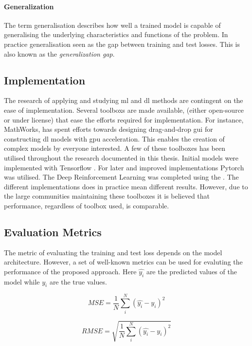 \paragraph{Generalization}
The term generalisation describes how well a trained model is capable of generalising the underlying characteristics and functions of the problem. In practice generalisation seen as the gap between training and test losses. This is also known as the \emph{generalization gap}. 

\subsection{Implementation}
The research of applying and studying \gls{ml} and \gls{dl} methods are contingent on the ease of implementation. Several toolboxs are made available, (either open-source or under license) that ease the efforts required for implementation. For instance, MathWorks, has spent efforts towards designing drag-and-drop \gls{gui} for constructing \gls{dl} models with \gls{gpu} acceleration. This enables the creation of complex models by everyone interested. A few of these toolboxes has been utilised throughout the research documented in this thesis. Initial models were implemented with Tensorflow \cite{tensorflow2015-whitepaper}. For later and improved implementations Pytorch \cite{Paszke2017AutomaticPyTorch} was utilised. The Deep Reinforcement Learning was completed using the \cite{MATLABRL_toolbox}. The different implementations does in practice mean different results. However, due to the large communities maintaining these toolboxes it is believed that performance, regardless of toolbox used, is comparable. 

\subsection{Evaluation Metrics}\label{subsec:eval_metrics}
The metric of evaluating the training and test loss depends on the model architecture. However, a set of well-known metrics can be used for evaluting the performance of the proposed approach. Here $\hat{y_i}$ are the predicted values of the model while $y_i$ are the true values.

\begin{equation}
    MSE =  \frac{1}{N} \sum_i^N (\hat{y_i} - y_i)^2
\end{equation}

\begin{equation}\label{eq:rmse}
    RMSE = \sqrt{\frac{1}{N} \sum_i^N (\hat{y_i} - y_i)^2}
\end{equation}

